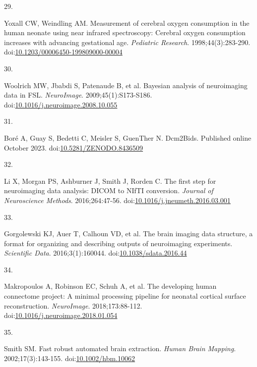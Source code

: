 \documentclass[
  letterpaper,
  DIV=11,
  numbers=noendperiod]{scrartcl}
\newlength{\cslhangindent}
\newlength{\csllabelwidth}
\newenvironment{CSLReferences}[2] %
 {\begin{list}{}{%
  \setlength{\itemindent}{0pt}
  \setlength{\leftmargin}{0pt}
  \setlength{\parsep}{0pt}
  \ifodd #1
   \setlength{\leftmargin}{\cslhangindent}
   \setlength{\itemindent}{-1\cslhangindent}
  \fi
  \setlength{\itemsep}{#2\baselineskip}}}
 {\end{list}}
\newcommand{\CSLLeftMargin}[1]{\parbox[t]{\csllabelwidth}{\strut#1\strut}}
\newcommand{\CSLRightInline}[1]{\parbox[t]{\linewidth - \csllabelwidth}{\strut#1\strut}}
\begin{document}
\begin{CSLReferences}{0}{1}
\CSLLeftMargin{29. }%
\CSLRightInline{Yoxall CW, Weindling AM. Measurement of cerebral oxygen
consumption in the human neonate using near infrared spectroscopy:
Cerebral oxygen consumption increases with advancing gestational age.
\emph{Pediatric Research}. 1998;44(3):283-290.
doi:\href{https://doi.org/10.1203/00006450-199809000-00004}{10.1203/00006450-199809000-00004}}

\CSLLeftMargin{30. }%
\CSLRightInline{Woolrich MW, Jbabdi S, Patenaude B, et al. Bayesian
analysis of neuroimaging data in {FSL}. \emph{NeuroImage}.
2009;45(1):S173-S186.
doi:\href{https://doi.org/10.1016/j.neuroimage.2008.10.055}{10.1016/j.neuroimage.2008.10.055}}

\CSLLeftMargin{31. }%
\CSLRightInline{Boré A, Guay S, Bedetti C, Meisler S, GuenTher N.
{Dcm2Bids}. Published online October 2023.
doi:\href{https://doi.org/10.5281/ZENODO.8436509}{10.5281/ZENODO.8436509}}

\CSLLeftMargin{32. }%
\CSLRightInline{Li X, Morgan PS, Ashburner J, Smith J, Rorden C. The
first step for neuroimaging data analysis: {DICOM} to {NIfTI}
conversion. \emph{Journal of Neuroscience Methods}. 2016;264:47-56.
doi:\href{https://doi.org/10.1016/j.jneumeth.2016.03.001}{10.1016/j.jneumeth.2016.03.001}}

\CSLLeftMargin{33. }%
\CSLRightInline{Gorgolewski KJ, Auer T, Calhoun VD, et al. The brain
imaging data structure, a format for organizing and describing outputs
of neuroimaging experiments. \emph{Scientific Data}. 2016;3(1):160044.
doi:\href{https://doi.org/10.1038/sdata.2016.44}{10.1038/sdata.2016.44}}

\CSLLeftMargin{34. }%
\CSLRightInline{Makropoulos A, Robinson EC, Schuh A, et al. The
developing human connectome project: {A} minimal processing pipeline for
neonatal cortical surface reconstruction. \emph{NeuroImage}.
2018;173:88-112.
doi:\href{https://doi.org/10.1016/j.neuroimage.2018.01.054}{10.1016/j.neuroimage.2018.01.054}}

\CSLLeftMargin{35. }%
\CSLRightInline{Smith SM. Fast robust automated brain extraction.
\emph{Human Brain Mapping}. 2002;17(3):143-155.
doi:\href{https://doi.org/10.1002/hbm.10062}{10.1002/hbm.10062}}


\end{CSLReferences}
\end{document}
